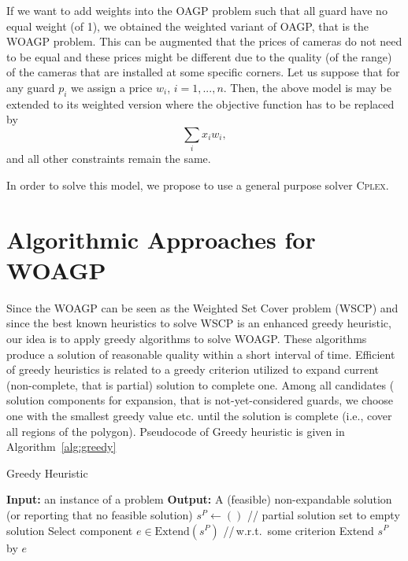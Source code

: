 \documentclass[runningheads,a4paper]{llncs}
\begin{document}
     If we want to add weights into the OAGP problem such that all guard have no equal weight (of 1), we obtained the weighted variant of OAGP, that is the WOAGP problem. This can be augmented that the prices of cameras do not need to be equal and these prices might be different due to the quality (of the range) of the cameras that are installed at some specific corners.  Let us suppose that for any guard $p_i$ we assign a price $w_i$, $i=1,...,n$. Then, the above model is may be extended to its weighted version where the objective function has to be replaced by
     $$ \sum_{i} x_i w_i,$$
      and all other constraints remain the same.
       
      In order to solve this model, we propose to use a general purpose solver \textsc{Cplex}. 
     \section{Algorithmic Approaches for WOAGP}
          Since the WOAGP can be seen as the Weighted Set Cover problem (WSCP) and since the best known heuristics to solve WSCP is an enhanced greedy heuristic, our idea is to apply greedy algorithms to solve WOAGP. These algorithms produce a solution of reasonable quality within a short interval of time. Efficient of greedy heuristics is related to a greedy criterion utilized to expand current (non-complete, that is partial) solution to complete one. Among all candidates ( solution components for expansion, that is not-yet-considered guards, we choose one with the smallest greedy value etc. until the solution is complete (i.e., cover all regions of the polygon).
          Pseudocode of Greedy heuristic is given in Algorithm~\ref{alg:greedy}
          
          \begin{algorithm}[!t] 
          	\caption{Greedy Heuristic}\label{alg:greedy}
          	\begin{algorithmic}[1]
          		\State \textbf{Input:} an instance of a problem
          		\State \textbf{Output:} A (feasible) non-expandable solution (or reporting that no feasible solution)
          		\State $s^{P} \gets ()$ \hspace{0.3cm}// partial solution set to empty solution
          		\State Select component $e \in  \text{Extend}(s^{P})$ \hspace{0.3cm}//\,w.r.t.\  some criterion
          		\State Extend $s^{P}$ by $e$
          		\EndWhile
          	\end{algorithmic}
          \end{algorithm}
\end{document}
